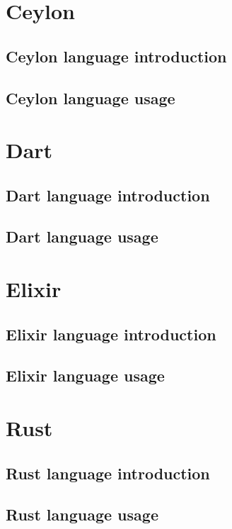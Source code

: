 \documentclass{abnt}
\begin{document}
\chapter{Ceylon}
\section{Ceylon language introduction}

\section{Ceylon language usage}


\chapter{Dart}
\section{Dart language introduction}

\section{Dart language usage}


\chapter{Elixir}
\section{Elixir language introduction}

\section{Elixir language usage}


\chapter{Rust}
\section{Rust language introduction}

\section{Rust language usage}



\end{document}
